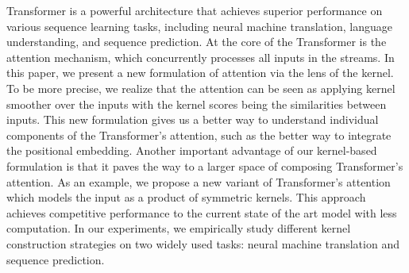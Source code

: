 Transformer is a powerful architecture that achieves superior performance on various sequence learning tasks, including neural machine translation, language understanding, and sequence prediction. At the core of the Transformer is the attention mechanism, which concurrently processes all inputs in the streams. In this paper, we present a new formulation of attention via the lens of the kernel. To be more precise, we realize that the attention can be seen as applying kernel smoother over the inputs with the kernel scores being the similarities between inputs. This new formulation gives us a better way to understand individual components of the Transformer's attention, such as the better way to integrate the positional embedding. Another important advantage of our kernel-based formulation is that it paves the way to a larger space of composing Transformer's attention. As an example, we propose a new variant of Transformer's attention which models the input as a product of symmetric kernels. This approach achieves competitive performance to the current state of the art model with less computation. In our experiments, we empirically study different kernel construction strategies on two widely used tasks: neural machine translation and sequence prediction.
